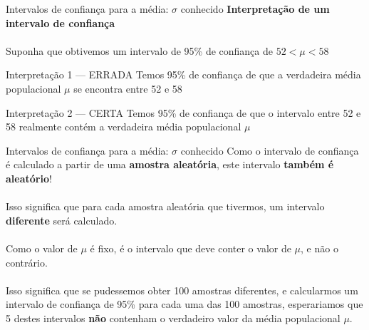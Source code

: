 \documentclass[10pt]{beamer}\usepackage[]{graphicx}\usepackage[]{color}
\theoremstyle{definition}
\begin{document}
\begin{frame}{Intervalos de confiança para a média: $\sigma$ conhecido}
  \textbf{Interpretação de um intervalo de confiança} \\~\\
  Suponha que obtivemos um intervalo de 95\% de confiança de $52 < \mu <
  58$
  \begin{alertblock}{Interpretação 1 --- ERRADA}
    Temos 95\% de confiança de que a verdadeira média populacional $\mu$
    se encontra entre 52 e 58
  \end{alertblock}
  \begin{block}{Interpretação 2 --- CERTA}
    Temos 95\% de confiança de que o intervalo entre 52 e 58 realmente
    contém a verdadeira média populacional $\mu$
  \end{block}
\end{frame}

\begin{frame}{Intervalos de confiança para a média: $\sigma$ conhecido}
  Como o intervalo de confiança é calculado a partir de uma
  \textbf{amostra aleatória}, este intervalo \textbf{também é
    aleatório}! \\~\\
  Isso significa que para cada amostra aleatória que tivermos, um
  intervalo \textbf{diferente} será calculado. \\~\\
  Como o valor de $\mu$ é fixo, é o intervalo que deve conter o valor de
  $\mu$, e não o contrário. \\~\\
  Isso significa que se pudessemos obter 100 amostras diferentes, e
  calcularmos um intervalo de confiança de 95\% para cada uma das 100
  amostras, esperariamos que 5 destes intervalos \textbf{não} contenham
  o verdadeiro valor da média populacional $\mu$.
\end{frame}
\end{document}
